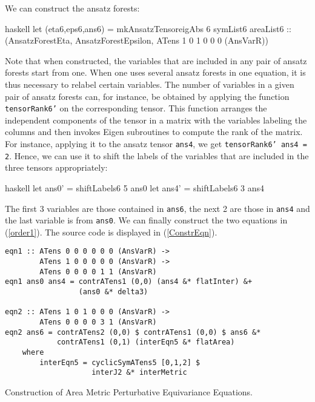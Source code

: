 We can construct the ansatz forests:
\begin{center}
\begin{cminted}{haskell}
let (eta6,eps6,ans6) = mkAnsatzTensoreigAbs 6 symList6 areaList6 :: 
                       (AnsatzForestEta, AnsatzForestEpsilon,
                       ATens 1 0 1 0 0 0 (AnsVarR))
\end{cminted}
\end{center}
Note that when constructed, the variables that are included in any pair of ansatz forests start from one. When one uses several ansatz forests in one equation, it is thus necessary to relabel certain variables. The number of variables in a given pair of ansatz forests can, for instance, be obtained by applying the function \texttt{tensorRank6'} on the corresponding tensor. This function arranges the independent components of the tensor in a matrix with the variables labeling the columns and then invokes Eigen subroutines to compute the rank of the matrix. For instance, applying it to the ansatz tensor \texttt{ans4}, we get \texttt{tensorRank6' ans4 = 2}. Hence, we can use it to shift the labels of the variables that are included in the three tensors appropriately:
\begin{center}
\begin{cminted}{haskell}
let ans0' = shiftLabels6 5 ans0
let ans4' = shiftLabels6 3 ans4 
\end{cminted}
\end{center}

The first 3 variables are those contained in \texttt{ans6}, the next 2 are those in \texttt{ans4} and the last variable is from \texttt{ans0}.
We can finally construct the two equations in (\ref{order1}). The source code is displayed in (\ref{ConstrEqn}).
\begin{listing}[hbt!]
\begin{verbatim}
eqn1 :: ATens 0 0 0 0 0 0 (AnsVarR) ->
        ATens 1 0 0 0 0 0 (AnsVarR) ->
        ATens 0 0 0 0 1 1 (AnsVarR)
eqn1 ans0 ans4 = contrATens1 (0,0) (ans4 &* flatInter) &+
                 (ans0 &* delta3)
                 
eqn2 :: ATens 1 0 1 0 0 0 (AnsVarR) ->
        ATens 0 0 0 0 3 1 (AnsVarR)
eqn2 ans6 = contrATens2 (0,0) $ contrATens1 (0,0) $ ans6 &*
            contrATens1 (0,1) (interEqn5 &* flatArea)
    where 
        interEqn5 = cyclicSymATens5 [0,1,2] $
                    interJ2 &* interMetric
\end{verbatim} 
\caption{Construction of Area Metric Perturbative Equivariance  Equations.}\label{ConstrEqn}
\end{listing}

